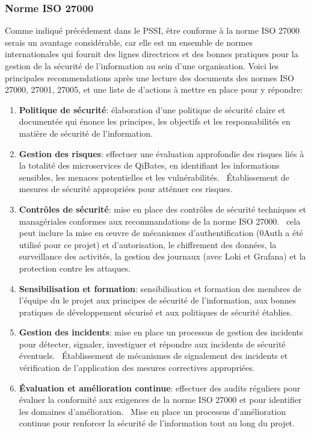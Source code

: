 \documentclass[a4paper, 11pt]{report}
\begin{document}
  \subsubsection{Norme ISO 27000}
  Comme indiqué précédement dans le PSSI, être conforme à la norme ISO 27000 serais un avantage considérable, car elle est un ensemble de normes internationales qui fournit des lignes directrices et des bonnes pratiques pour la gestion de la sécurité de l'information au sein d'une organisation.
  Voici les principales recommendations après une lecture des documents des normes ISO 27000, 27001, 27005, et une liste de d'actions à mettre en place pour y répondre:
  \begin{enumerate}
    \item \textbf{Politique de sécurité}: élaboration d'une politique de sécurité claire et documentée qui énonce les principes, les objectifs et les responsabilités en matière de sécurité de l'information.
    \item \textbf{Gestion des risques}: effectuer une évaluation approfondie des risques liés à la totalité des microservices de QiBates, en identifiant les informations sensibles, les menaces potentielles et les vulnérabilités.
      \ Établissement de mesures de sécurité appropriées pour atténuer ces risques.
    \item \textbf{Contrôles de sécurité}: mise en place des contrôles de sécurité techniques et managériales conformes aux recommandations de la norme ISO 27000.
      \ cela peut inclure la mise en œuvre de mécanismes d'authentification (0Auth a été utilisé pour ce projet) et d'autorisation, le chiffrement des données, la surveillance des activités, la gestion des journaux (avec Loki et Grafana) et la protection contre les attaques.
    \item \textbf{Sensibilisation et formation}: sensibilisation et formation des membres de l'équipe du le projet aux principes de sécurité de l'information, aux bonnes pratiques de développement sécurisé et aux politiques de sécurité établies.
    \item \textbf{Gestion des incidents}: mise en place un processus de gestion des incidents pour détecter, signaler, investiguer et répondre aux incidents de sécurité éventuels.
      \ Établissement de mécanismes de signalement des incidents et vérification de l'application des mesures correctives appropriées.
    \item \textbf{Évaluation et amélioration continue}: effectuer des audits réguliers pour évaluer la conformité aux exigences de la norme ISO 27000 et pour identifier les domaines d'amélioration.
      \ Mise en place un processus d'amélioration continue pour renforcer la sécurité de l'information tout au long du projet.
  \end{enumerate}
\end{document}
